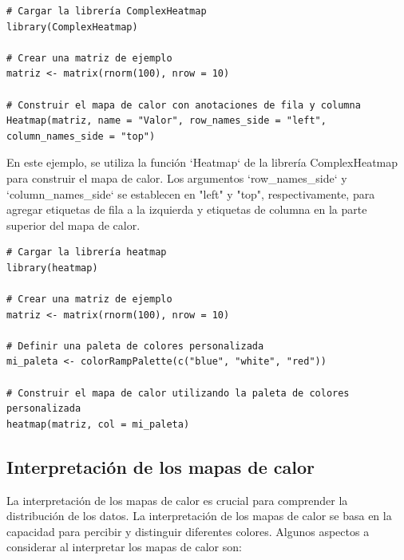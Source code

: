 \documentclass{article}
\begin{document}
\begin{itemize}
\begin{verbatim}
# Cargar la librería ComplexHeatmap
library(ComplexHeatmap)

# Crear una matriz de ejemplo
matriz <- matrix(rnorm(100), nrow = 10)

# Construir el mapa de calor con anotaciones de fila y columna
Heatmap(matriz, name = "Valor", row_names_side = "left", column_names_side = "top")
\end{verbatim}

En este ejemplo, se utiliza la función `Heatmap` de la librería ComplexHeatmap para construir el mapa de calor. Los argumentos `row\_names\_side` y `column\_names\_side` se establecen en "left" y "top", respectivamente, para agregar etiquetas de fila a la izquierda y etiquetas de columna en la parte superior del mapa de calor.

\begin{verbatim}
# Cargar la librería heatmap
library(heatmap)

# Crear una matriz de ejemplo
matriz <- matrix(rnorm(100), nrow = 10)

# Definir una paleta de colores personalizada
mi_paleta <- colorRampPalette(c("blue", "white", "red"))

# Construir el mapa de calor utilizando la paleta de colores personalizada
heatmap(matriz, col = mi_paleta)
\end{verbatim}

\end{itemize}

\subsection{Interpretación de los mapas de calor}
La interpretación de los mapas de calor es crucial para comprender la distribución de los datos.  La interpretación de los mapas de calor se basa en la capacidad para percibir y distinguir diferentes colores.  Algunos aspectos a considerar al interpretar los mapas de calor son:
\end{document}
